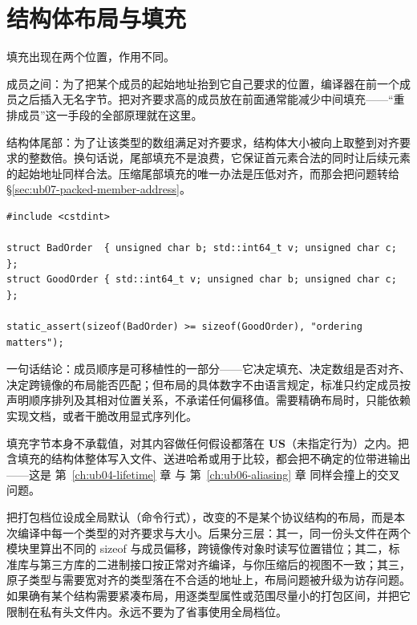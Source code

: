 \documentclass[12pt,a4paper,fontset=fandol]{ctexbook}
\newcommand{\Lang}[1]{\textsf{#1}}
\newcommand{\USB}{\textbf{\textsf{US}}}
\begin{document}
\section{结构体布局与填充}\label{sec:ub07-layout}

填充出现在两个位置，作用不同。

成员之间：为了把某个成员的起始地址抬到它自己要求的位置，编译器在前一个成员之后插入无名字节。把对齐要求高的成员放在前面通常能减少中间填充——“重排成员”这一手段的全部原理就在这里。

结构体尾部：为了让该类型的数组满足对齐要求，结构体大小被向上取整到对齐要求的整数倍。换句话说，尾部填充不是浪费，它保证首元素合法的同时让后续元素的起始地址同样合法。压缩尾部填充的唯一办法是压低对齐，而那会把问题转给 §\ref{sec:ub07-packed-member-address}。

\begin{lstlisting}[style=cppstyle,caption={同样的成员、不同的顺序，大小可能不同}]
#include <cstdint>

struct BadOrder  { unsigned char b; std::int64_t v; unsigned char c; };
struct GoodOrder { std::int64_t v; unsigned char b; unsigned char c; };

static_assert(sizeof(BadOrder) >= sizeof(GoodOrder), "ordering matters");
\end{lstlisting}

一句话结论：成员顺序是可移植性的一部分——它决定填充、决定数组是否对齐、决定跨镜像的布局能否匹配；但布局的具体数字不由语言规定，标准只约定成员按声明顺序排列及其相对位置关系，不承诺任何偏移值。需要精确布局时，只能依赖实现文档，或者干脆改用显式序列化。

填充字节本身不承载值，对其内容做任何假设都落在 \USB（未指定行为）之内。把含填充的结构体整体写入文件、送进哈希或用于比较，都会把不确定的位带进输出——这是 第~\ref{ch:ub04-lifetime} 章 与 第~\ref{ch:ub06-aliasing} 章 同样会撞上的交叉问题。

\begin{warning}[title={全局打包档位改变所有类型的对齐，进而改变跨镜像的 ABI 契约}]
把打包档位设成全局默认（命令行式），改变的不是某个协议结构的布局，而是本次编译中每一个类型的对齐要求与大小。后果分三层：其一，同一份头文件在两个模块里算出不同的 \Lang{sizeof} 与成员偏移，跨镜像传对象时读写位置错位；其二，标准库与第三方库的二进制接口按正常对齐编译，与你压缩后的视图不一致；其三，原子类型与需要宽对齐的类型落在不合适的地址上，布局问题被升级为访存问题。如果确有某个结构需要紧凑布局，用逐类型属性或范围尽量小的打包区间，并把它限制在私有头文件内。永远不要为了省事使用全局档位。
\end{warning}
\end{document}
